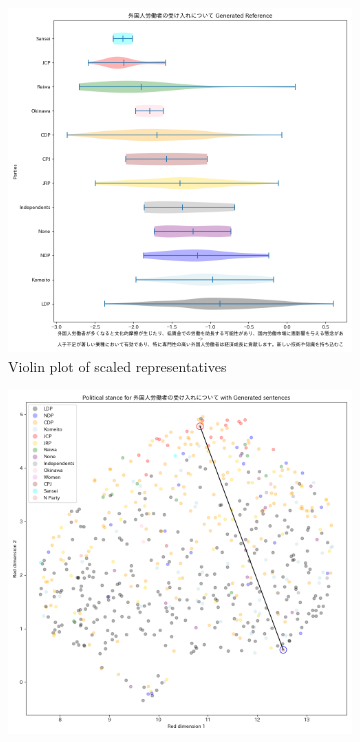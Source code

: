 \documentclass[final,5p,times,twocolumn,authoryear]{elsarticle}
\begin{document}
\begin{figure}[h]
\centering
    \begin{subfigure}{0.22\textwidth}
      \centering
      \includegraphics[width=1\linewidth]{figs/results/economy/外国人労働者の受け入れについて_gen_violin_plot.png}
      \caption{Violin plot of scaled representatives}
    \end{subfigure}
    \begin{subfigure}{0.22\textwidth}
      \centering
      \includegraphics[width=1\linewidth]{figs/results/economy/外国人労働者の受け入れについて_umap_gen.png}

\end{subfigure}
\end{figure}
\end{document}
